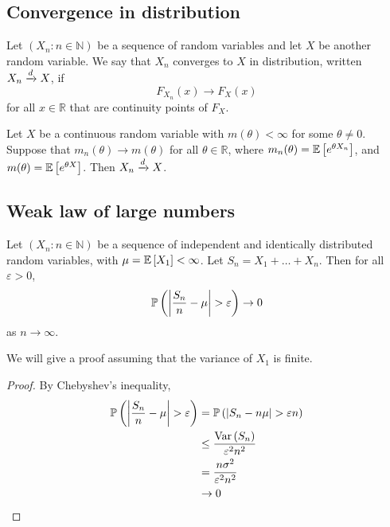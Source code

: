 \subsection{Convergence in distribution}
\begin{definition}
	Let \((X_n \colon n \in \mathbb N)\) be a sequence of random variables and let \(X\) be another random variable.
	We say that \(X_n\) converges to \(X\) in distribution, written \(X_n \xrightarrow{d} X\), if
	\[
		F_{X_n}(x) \to F_X(x)
	\]
	for all \(x \in \mathbb R\) that are continuity points of \(F_X\).
\end{definition}
\begin{theorem}
	Let \(X\) be a continuous random variable with \(m(\theta) < \infty\) for some \(\theta \neq 0\).
	Suppose that \(m_n(\theta) \to m(\theta)\) for all \(\theta \in \mathbb R\), where \(m_n(\theta) = \mathbb{E}\left[{e^{\theta X_n}}\right]\), and \(m(\theta) = \mathbb{E}\left[{e^{\theta X}}\right]\).
	Then \(X_n \xrightarrow{d} X\).
\end{theorem}

\subsection{Weak law of large numbers}
\begin{theorem}
	Let \((X_n \colon n \in \mathbb N)\) be a sequence of independent and identically distributed random variables, with \(\mu = \mathbb{E}\left[{X_1}\right] < \infty\).
	Let \(S_n = X_1 + \dots + X_n\).
	Then for all \(\varepsilon > 0\),
	\[
		\mathbb{P}\left({\abs{\frac{S_n}{n} - \mu} > \varepsilon}\right) \to 0
	\]
	as \(n \to \infty\).
\end{theorem}
\noindent We will give a proof assuming that the variance of \(X_1\) is finite.
\begin{proof}
	By Chebyshev's inequality,
	\begin{align*}
		\mathbb{P}\left({\abs{\frac{S_n}{n} - \mu} > \varepsilon}\right) & = \mathbb{P}\left({\abs{S_n - n\mu} > \varepsilon n}\right) \\
		                                               & \leq \frac{\operatorname{Var}\left({S_n}\right)}{\varepsilon^2 n^2}  \\
		                                               & = \frac{n\sigma^2}{\varepsilon^2 n^2}     \\
		                                               & \to 0
	\end{align*}
\end{proof}

